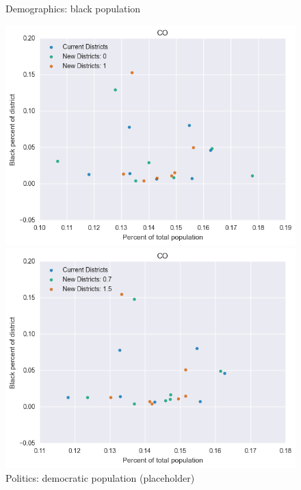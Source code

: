 \begin{figure}[htb!] \centering
\caption{ Demographics: black population }
\includegraphics[width=4.5in]{../analysis/CO/analysis_scatter.png}
\caption{ Politics: democratic population (placeholder)}
\includegraphics[width=4.5in]{../analysis/CO/analysis_scatter2.png}
\end{figure}

\clearpage
\newpage


